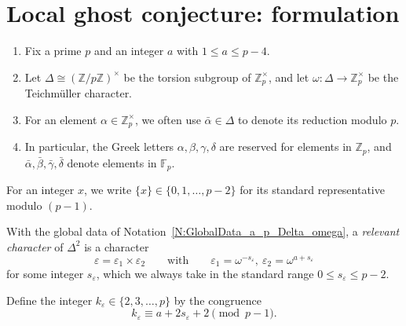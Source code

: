 \section{Local ghost conjecture: formulation}

\begin{notation}
    \label{N:GlobalData_a_p_Delta_omega}
    \begin{enumerate}
        \item Fix a prime $p$ and an integer $a$ with $1\le a\le p-4$.
        \item Let $\Delta \cong ({\mathbb{Z}}/p{\mathbb{Z}})^\times$ be the torsion subgroup of
    ${\mathbb{Z}}_p^\times$, and let $\omega:\Delta\rightarrow {\mathbb{Z}}_p^\times$ be the
    Teichm\"{u}ller character.
        \item For an element $\alpha \in {\mathbb{Z}}_p^\times$, we often use $\bar \alpha \in \Delta $ to denote its reduction modulo $p$.
        \item In particular, the Greek letters $\alpha, \beta, \gamma, \delta$ are reserved for elements in ${\mathbb{Z}}_p$, and $\bar \alpha, \bar \beta, \bar \gamma, \bar \delta$ denote elements in ${\mathbb{F}}_p$.
    \end{enumerate}
\end{notation}

\begin{notation}
    For an integer $x$, we write $\{x\}\in\{0,1,\dots,p-2\}$ for its standard representative modulo $(p-1)$.
\end{notation}

\begin{definition}
    \label{D:relevant_varepsilon}
    With the global data of Notation~\ref{N:GlobalData_a_p_Delta_omega}, a \emph{relevant character} of $\Delta^2$ is a character
    \[
    \varepsilon=\varepsilon_1\times \varepsilon_2
    \qquad\text{with}\qquad
    \varepsilon_1=\omega^{-s_\varepsilon},\ \varepsilon_2=\omega^{a+s_\varepsilon}
    \]
    for some integer $s_\varepsilon$, which we always take in the standard range $0\le s_\varepsilon\le p-2$.
\end{definition}

\begin{definition}
    Define the integer $k_\varepsilon\in\{2,3,\dots,p\}$ by the congruence
    \[
    k_\varepsilon \equiv a+2s_\varepsilon+2 \pmod{p-1}.
    \]
\end{definition}

